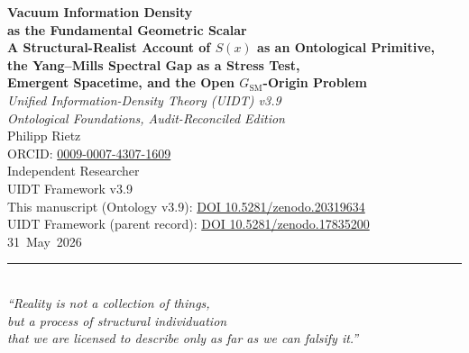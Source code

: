 \documentclass[12pt,a4paper,twoside]{article}
\theoremstyle{plain}
\theoremstyle{definition}
\theoremstyle{remark}
\begin{document}
\pagestyle{uidtontology}

\begin{titlepage}
\vspace*{1.6cm}
\begin{center}
{\LARGE\bfseries Vacuum Information Density\\[0.25em]
as the Fundamental Geometric Scalar}\\[0.9em]
{\small\bfseries A Structural-Realist Account of \(S(x)\) as an Ontological Primitive,\\[0.25em]
the Yang--Mills Spectral Gap as a Stress Test,\\[0.25em]
Emergent Spacetime, and the Open \(G_{\mathrm{SM}}\)-Origin Problem}\\[1.5em]
{\large\itshape Unified Information-Density Theory (UIDT) v3.9\\[0.25em]
Ontological Foundations, Audit-Reconciled Edition}\\[2.6em]
{\small Philipp Rietz}\\[0.5em]
{\small ORCID: \href{https://orcid.org/0009-0007-4307-1609}{0009-0007-4307-1609}}\\[0.2em]
{\small Independent Researcher}\\[3em]
{\normalsize UIDT Framework v3.9}\\[0.5em]
{\small This manuscript (Ontology v3.9):
\href{https://doi.org/10.5281/zenodo.20319634}{DOI 10.5281/zenodo.20319634}}\\[0.25em]
{\small UIDT Framework (parent record):
\href{https://doi.org/10.5281/zenodo.17835200}{DOI 10.5281/zenodo.17835200}}\\[0.5em]
{\small 31~May~2026 }\\[2.2em]
\rule{0.6\textwidth}{0.4pt}\\[1em]
{\small\itshape ``Reality is not a collection of things,\\
but a process of structural individuation\\
that we are licensed to describe only as far as we can falsify it.''}\\[1.4em]
\end{center}
\end{titlepage}

\newpage
\tableofcontents
\newpage
\end{document}
